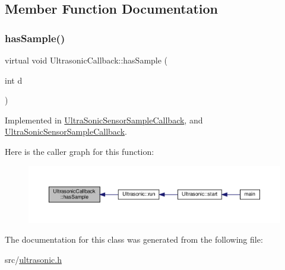 \subsection{Member Function Documentation}
\mbox{\label{classUltrasonicCallback_aded93e2bea7669f1f225f8b35a085052}} 
\subsubsection{\texorpdfstring{has\+Sample()}{hasSample()}}
{\footnotesize\ttfamily virtual void Ultrasonic\+Callback\+::has\+Sample (\begin{DoxyParamCaption}\item[{int}]{d }\end{DoxyParamCaption})\hspace{0.3cm}{\ttfamily [pure virtual]}}



Implemented in \hyperlink{classUltraSonicSensorSampleCallback_abe420043f2ea2123654d55d06d9315ac}{Ultra\+Sonic\+Sensor\+Sample\+Callback}, and \hyperlink{classUltraSonicSensorSampleCallback_abe420043f2ea2123654d55d06d9315ac}{Ultra\+Sonic\+Sensor\+Sample\+Callback}.

Here is the caller graph for this function\+:
\nopagebreak
\begin{figure}[H]
\begin{center}
\leavevmode
\includegraphics[width=350pt]{classUltrasonicCallback_aded93e2bea7669f1f225f8b35a085052_icgraph}
\end{center}
\end{figure}


The documentation for this class was generated from the following file\+:\begin{DoxyCompactItemize}
\item 
src/\hyperlink{ultrasonic_8h}{ultrasonic.\+h}\end{DoxyCompactItemize}
